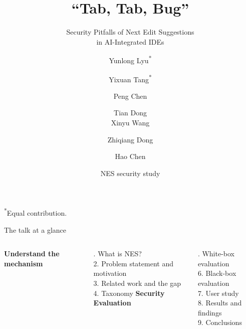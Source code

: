 \documentclass[aspectratio=169,12pt]{beamer}
\title[Tab, Tab, Bug]{``Tab, Tab, Bug''}
\subtitle{Security Pitfalls of Next Edit Suggestions\\in AI-Integrated IDEs}
\author[Y. Lyu, Y. Tang, P. Chen, T. Dong, X. Wang, Z. Dong, H. Chen]{Yunlong Lyu\textsuperscript{*} \and Yixuan Tang\textsuperscript{*} \and Peng Chen \and Tian Dong\\Xinyu Wang \and Zhiqiang Dong \and Hao Chen}
\institute{The University of Hong Kong \quad McGill University \quad Independent Researchers}
\date{NES security study}
\begin{document}
\rmfamily
\begin{frame}
\titlepage
\vspace{-4mm}
\begin{center}\footnotesize\textsuperscript{*}Equal contribution.\end{center}
\end{frame}
\begin{frame}{The talk at a glance}
\begin{columns}[T]
\textbf{Understand the mechanism}\par{}. What is NES?\\[5pt]
2. Problem statement and motivation\\[5pt]
3. Related work and the gap\\[5pt]
4. Taxonomy
\textbf{Security Evaluation}\par{}. White-box evaluation\\[5pt]
6. Black-box evaluation\\[5pt]
7. User study\\[5pt]
8. Results and findings\\[5pt]
9. Conclusions
\end{columns}
\end{frame}









% 
\end{document}
